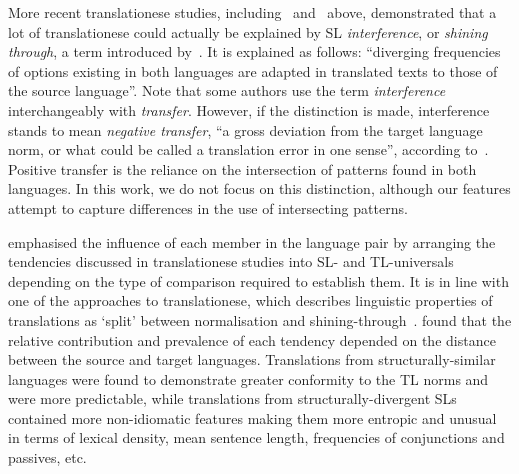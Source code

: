More recent translationese studies, including~\citet{Koppel2011,Volansky2015,Rabinovich2017,Chowdhury2020,Chowdhury2021,Kunilovskaya2020vars} and~\citet{Evert2017} above, demonstrated that a lot of translationese could actually be explained by SL \textit{interference}, or \textit{shining through}, a term introduced by~\citet{Teich2003}. It is explained as follows: ``diverging frequencies of options existing in both languages are adapted in translated texts to those of the source language''. %
Note that some authors use the term \textit{interference} interchangeably with \textit{transfer}. However, if the distinction is made, interference stands to mean \textit{negative transfer}, ``a gross deviation from the target language norm, or what could be called a translation error in one sense'', according to~\citet[p.71--72]{Mauranen2004}. Positive transfer is the reliance on the intersection of patterns found in both languages. In this work, we do not focus on this distinction, although our features attempt to capture differences in the use of intersecting patterns.

\citet{Chesterman2004} emphasised the influence of each member in the language pair by arranging the tendencies discussed in translationese studies into SL- and TL-universals depending on the type of comparison required to establish them. It is in line with one of the approaches to translationese, which describes linguistic properties of translations as `split' between normalisation and shining-through~\cite[see, for example, ][]{HansenSchirra2011}. \citet{Nikolaev2020} found that the relative contribution and prevalence of each tendency depended on the distance between the source and target languages. Translations from structurally-similar languages were found to demonstrate greater conformity to the TL norms and were more predictable, while translations from structurally-divergent SLs contained more non-idiomatic features making them more entropic and unusual in terms of lexical density, mean sentence length, frequencies of conjunctions and passives, etc. 

